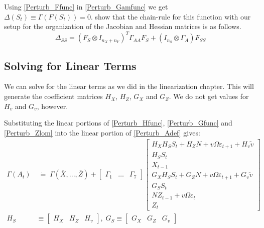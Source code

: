 \documentclass[letterpaper,12pt]{article}
\newcommand{\ve}{\varepsilon}
\theoremstyle{definition}
\begin{document}
\begin{spacing}{1.5}
		Using \eqref{Perturb_Ffunc} in \eqref{Perturb_Gamfunc} we get $\Delta(S_t) \equiv \Gamma(F(S_t)) = 0$.  \citet{MagnusNeudecker:1999} show that the chain-rule for this function with our setup for the organization of the Jacobian and Hessian matrices is as follows.
		\begin{equation} \label{Perturb_MNchain}
			\Delta_{SS} = (F_S \otimes I_{n_X+n_Y})^T \Gamma_{AA} F_S + (I_{n_S} \otimes \Gamma_A) F_{SS}
		\end{equation}

	\subsection{Solving for Linear Terms}
		We can solve for the linear terms as we did in the linearization chapter.  This will generate the coefficient matrices $H_X$, $H_Z$, $G_X$ and $G_Z$.  We do not get values for $H_v$ and $G_v$, however.

		Substituting the linear portions of \eqref{Perturb_Hfunc}, \eqref{Perturb_Gfunc} and \eqref{Perturb_Zlom} into the linear portion of \eqref{Perturb_Adef} gives:
		\begin{equation} \nonumber
		\begin{split}
		\Gamma(A_t) & \;\dot =\; \Gamma(\bar X, ..., \bar Z) + \begin{bmatrix} \Gamma_1 & \dots & \Gamma_7 \end{bmatrix} 
		\begin{bmatrix}
			H_X H_S S_t + H_Z N + v \Omega \ve_{t+1} + H_v \tilde v \\
			H_S S_t \\ 
			X_{t-1} \\ 
			G_X H_S S_t + G_Z N + v \Omega \ve_{t+1} + G_v \tilde v \\ 
			G_S S_t 
			\\ N Z_{t-1} + v \Omega \ve_t 
			\\ Z_t \end{bmatrix} \\
			H_S & \equiv \begin{bmatrix} H_X & H_Z & H_v \end{bmatrix},\; G_S \equiv \begin{bmatrix} G_X & G_Z & G_v \end{bmatrix}
		\end{split}
		\end{equation}


\end{spacing}
\end{document}
